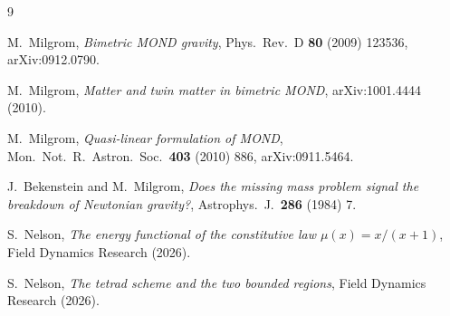 \documentclass[twocolumn]{iopjournal}
\begin{document}

\begin{thebibliography}{9}

M.~Milgrom,
\textit{Bimetric MOND gravity},
Phys.\ Rev.\ D \textbf{80} (2009) 123536, arXiv:0912.0790.

M.~Milgrom,
\textit{Matter and twin matter in bimetric MOND},
arXiv:1001.4444 (2010).

M.~Milgrom,
\textit{Quasi-linear formulation of MOND},
Mon.\ Not.\ R.\ Astron.\ Soc.\ \textbf{403} (2010) 886,
arXiv:0911.5464.

J.~Bekenstein and M.~Milgrom,
\textit{Does the missing mass problem signal the breakdown of
Newtonian gravity?},
Astrophys.\ J.\ \textbf{286} (1984) 7.

S.~Nelson,
\textit{The energy functional of the constitutive law
$\mu(x) = x/(x+1)$}, Field Dynamics Research (2026).

S.~Nelson,
\textit{The tetrad scheme and the two bounded regions},
Field Dynamics Research (2026).

\end{thebibliography}
\end{document}
